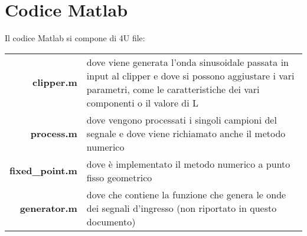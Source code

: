 \chapter{Codice Matlab}
	\label{code:matlab}
	Il codice Matlab si compone di 4U file:
	
	\noindent\hspace{5px}\begin{tabularx}{\textwidth}{r X}
		\textbf{clipper.m}			&dove viene generata l'onda sinusoidale passata in input al clipper e dove si possono aggiustare i vari parametri, come le caratteristiche dei vari componenti o il valore di L\\
		\textbf{process.m}			&dove vengono processati i singoli campioni del segnale e dove viene richiamato anche il metodo numerico\\
		\textbf{fixed\_point.m}		&dove è implementato il metodo numerico a punto fisso geometrico\\
		\textbf{generator.m}			&dove che contiene la funzione che genera le onde dei segnali d'ingresso (non riportato in questo documento)
	\end{tabularx}\\
	

